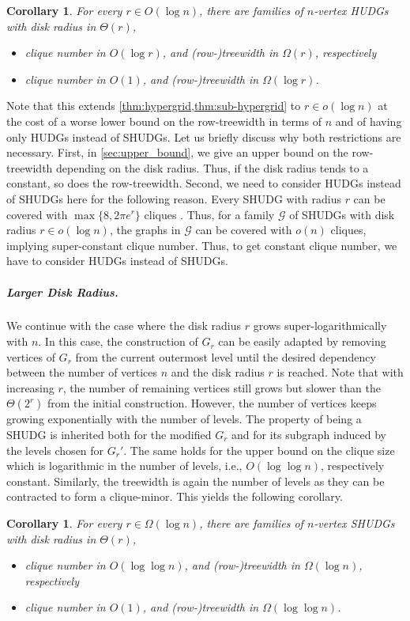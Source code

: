 \documentclass[11pt]{article}
\newtheorem{corollary}[theorem]{Corollary}
\newcommand{\calG}{\ensuremath{\mathcal{G}}\xspace}
\begin{document}
%
\begin{corollary}
    \label{cor:lower-bound-sub-log-radius}
    For every $r \in O(\log n)$, there are families of $n$-vertex HUDGs with disk radius in $\Theta(r)$, 
    \begin{itemize}
        \item clique number in $ O(\log r) $, and (row-)treewidth in $ \Omega(r) $, respectively
        \item clique number in $ O(1) $, and (row-)treewidth in $ \Omega(\log r) $.
    \end{itemize}
%
\end{corollary}
%
Note that this extends \cref{thm:hypergrid,thm:sub-hypergrid} to $ r \in o(\log n) $ at the cost of a worse lower bound on the row-treewidth in terms of $ n $ and of having only HUDGs instead of SHUDGs.
Let us briefly discuss why both restrictions are necessary.
First, in \cref{sec:upper_bound}, we give an upper bound on the row-treewidth depending on the disk radius.
Thus, if the disk radius tends to a constant, so does the row-treewidth.
%
Second, we need to consider HUDGs instead of SHUDGs here for the following reason.
Every SHUDG with radius $ r $ can be covered with $\max\{8, 2\pi e^r\}$ cliques \cite[Lemma~8]{blasius_strongly_2023}.
Thus, for a family $\calG$ of SHUDGs with disk radius $r \in o(\log n)$, the graphs in $\calG$ can be covered with $o(n)$ cliques, implying super-constant clique number.  Thus, to get constant clique number, we have to consider HUDGs instead of SHUDGs.
%
%
\subparagraph{Larger Disk Radius.}
%
We continue with the case where the disk radius $r$ grows super-logarithmically with $n$.
In this case, the construction of $G_r$ can be easily adapted by removing vertices of $G_r$ from the current outermost level until the desired dependency between the number of vertices $n$ and the disk radius $r$ is reached.
Note that with increasing $ r $, the number of remaining vertices still grows but slower than the $ \Theta(2^r) $ from the initial construction.
However, the number of vertices keeps growing exponentially with the number of levels.
The property of being a SHUDG is inherited both for the modified $ G_r $ and for its subgraph induced by the levels chosen for $ G_r' $.
The same holds for the upper bound on the clique size which is logarithmic in the number of levels, i.e., $ O(\log \log n) $, respectively constant.
Similarly, the treewidth is again the number of levels as they can be contracted to form a clique-minor.
This yields the following corollary.
%
\begin{corollary}
    \label{cor:lower-bound-super-log-radius}
    For every $r \in \Omega(\log n)$, there are families of $n$-vertex SHUDGs with disk radius in $\Theta(r)$, 
    \begin{itemize}
        \item clique number in $O(\log\log n)$, and (row-)treewidth in $\Omega(\log n)$, respectively
        \item clique number in $O(1)$, and (row-)treewidth in $\Omega(\log\log n)$.
    \end{itemize}
%
\end{corollary}
\end{document}
